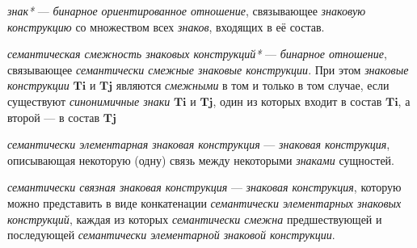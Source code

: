 \textit{знак*} --- \textit{бинарное ориентированное отношение}, связывающее \textit{знаковую конструкцию} со множеством всех \textit{знаков}, входящих в её состав.

\textit{семантическая смежность знаковых конструкций*} --- \textit{бинарное отношение}, связывающее \textit{семантически смежные знаковые конструкции}.
При этом \textit{знаковые конструкции} \textit{$\bm{Ti}$} и \textit{$\bm{Tj}$} являются \textit{смежными} в том и только в том случае, если существуют \textit{синонимичные знаки} \textit{$\bm{Ti}$} и \textit{$\bm{Tj}$}, один из которых входит в состав \textit{$\bm{Ti}$}, а второй --- в состав \textit{$\bm{Tj}$}

\begin{SCn}


\end{SCn}

\textit{семантически элементарная знаковая конструкция} --- \textit{знаковая конструкция}, описывающая некоторую (одну) связь между некоторыми \textit{знаками} сущностей.

\textit{семантически связная знаковая конструкция} --- \textit{знаковая конструкция}, которую можно представить в виде конкатенации \textit{семантически элементарных знаковых конструкций}, каждая из которых \textit{семантически смежна} предшествующей и последующей \textit{семантически элементарной знаковой конструкции}.

\begin{SCn}

    \begin{scnindent}
    \end{scnindent}
    \begin{scnindent}
    \end{scnindent}

\end{SCn}

